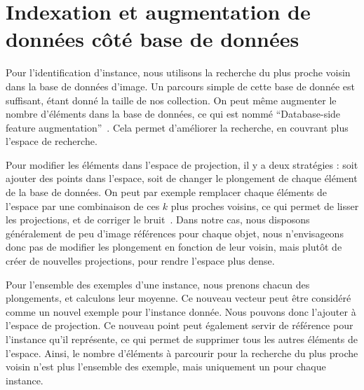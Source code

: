 \section{Indexation et augmentation de données côté base de données}

Pour l'identification d’instance, nous utilisons la recherche du plus proche voisin dans la base de données d’image.
Un parcours simple de cette base de donnée est suffisant, étant donné la taille de nos collection.
On peut même augmenter le nombre d’éléments dans la base de données, ce qui est nommé ``Database-side feature augmentation''~\cite{turcot_better_2009,arandjelovic_three_2012}.
Cela permet d’améliorer la recherche, en couvrant plus l’espace de recherche.

Pour modifier les éléments dans l’espace de projection, il y a deux stratégies : soit ajouter des points dans l'espace, soit de changer le plongement de chaque élément de la base de données.
On peut par exemple remplacer chaque éléments de l'espace par une combinaison de ces $k$ plus proches voisins, ce qui permet de lisser les projections, et de corriger le bruit~\cite{gordo2016deep}. 
Dans notre cas, nous disposons généralement de peu d'image références pour chaque objet, nous n'envisageons donc pas de modifier les plongement en fonction de leur voisin, mais plutôt de créer de nouvelles projections, pour rendre l'espace plus dense.

Pour l’ensemble des exemples d’une instance, nous prenons chacun des plongements, et calculons leur moyenne.
Ce nouveau vecteur peut être considéré comme un nouvel exemple pour l'instance donnée.
Nous pouvons donc l'ajouter à l'espace de projection.
Ce nouveau point peut également servir de référence pour l’instance qu’il représente, ce qui permet de supprimer tous les autres éléments de l’espace.
Ainsi, le nombre d'éléments à parcourir pour la recherche du plus proche voisin n’est plus l’ensemble des exemple, mais uniquement un pour chaque instance.


%

